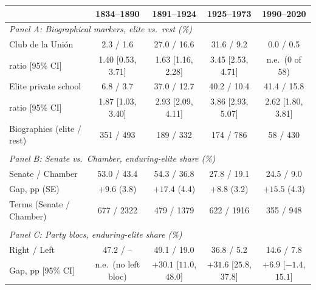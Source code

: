 \begin{tabular}{lcccc}
\toprule
 & 1834--1890 & 1891--1924 & 1925--1973 & 1990--2020 \\
\midrule
\multicolumn{5}{l}{\textit{Panel A: Biographical markers, elite vs.\ rest (\%)}} \\
\quad Club de la Uni\'on & 2.3 / 1.6 & 27.0 / 16.6 & 31.6 / 9.2 & 0.0 / 0.5 \\
\quad \quad ratio [95\% CI] & 1.40 [0.53, 3.71] & 1.63 [1.16, 2.28] & 3.45 [2.53, 4.71] & n.e.\ (0 of 58) \\
\quad Elite private school & 6.8 / 3.7 & 37.0 / 12.7 & 40.2 / 10.4 & 41.4 / 15.8 \\
\quad \quad ratio [95\% CI] & 1.87 [1.03, 3.40] & 2.93 [2.09, 4.11] & 3.86 [2.93, 5.07] & 2.62 [1.80, 3.81] \\
\quad Biographies (elite / rest) & 351 / 493 & 189 / 332 & 174 / 786 & 58 / 430 \\
\\[0.3em]
\multicolumn{5}{l}{\textit{Panel B: Senate vs.\ Chamber, enduring-elite share (\%)}} \\
\quad Senate / Chamber & 53.0 / 43.4 & 54.3 / 36.8 & 27.8 / 19.1 & 24.5 / 9.0 \\
\quad Gap, pp (SE) & $+9.6$ (3.8) & $+17.4$ (4.4) & $+8.8$ (3.2) & $+15.5$ (4.3) \\
\quad Terms (Senate / Chamber) & 677 / 2322 & 479 / 1379 & 622 / 1916 & 355 / 948 \\
\\[0.3em]
\multicolumn{5}{l}{\textit{Panel C: Party blocs, enduring-elite share (\%)}} \\
\quad Right / Left & 47.2 / -- & 49.1 / 19.0 & 36.8 / 5.2 & 14.6 / 7.8 \\
\quad Gap, pp [95\% CI] & n.e.\ (no left bloc) & $+30.1$ [$11.0$, $48.0$] & $+31.6$ [$25.8$, $37.8$] & $+6.9$ [$-1.4$, $15.1$] \\
\bottomrule
\end{tabular}
